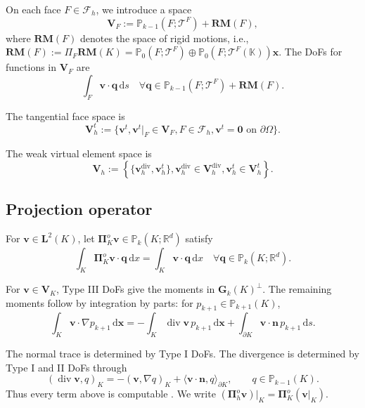 \documentclass[review,hidelinks,onefignum,onetabnum]{siamart251216}
\newcommand{\AI}[1]{{\color{blue}#1}}
\begin{document}
On each face \(F \in \mathcal{F}_h\), we introduce a space 
$$
\boldsymbol{V}_F := \mathbb{P}_{k-1}(F;\mathscr T^F) + \mathbf{RM}(F),
$$
 where \(\mathbf{RM}(F)\) denotes the space of rigid motions, i.e., \(\mathbf{RM}(F) :=\Pi_F \mathbf{RM}(K)= \mathbb{P}_0(F; \mathscr T^F) \oplus \mathbb{P}_0(F; \mathscr T^F(\mathbb K)) \boldsymbol{x}\). The DoFs for functions in \(\boldsymbol{V}_F\) are
\[
\int_F \boldsymbol{v} \cdot \boldsymbol{q} \, \mathrm{d}s \quad \forall \boldsymbol{q} \in \mathbb{P}_{k-1}(F;\mathscr T^F) + \mathbf{RM}(F).
\]

The tangential face space is
\[
\boldsymbol{V}_h^t := \{ \boldsymbol{v}^t, \boldsymbol{v}^t|_F \in \boldsymbol{V}_F, F \in \mathcal{F}_h, \boldsymbol{v}^t = \boldsymbol{0} \text{ on } \partial \Omega \}.
\]

The weak virtual element space is
\[
\boldsymbol{V}_h := \left\{ \{ \boldsymbol{v}_h^{\operatorname{div}}, \boldsymbol{v}_h^t \}, \boldsymbol{v}_h^{\operatorname{div}} \in \boldsymbol{V}_h^{\operatorname{div}}, \boldsymbol{v}_h^t \in \boldsymbol{V}_h^t \right\}.
\]

\subsection{Projection operator}

\AI{For $\boldsymbol v\in\boldsymbol L^2(K)$,} let \(\boldsymbol{\Pi}_K^o \boldsymbol{v} \in \mathbb{P}_k(K;\mathbb{R}^d)\) satisfy
\[
\int_K \boldsymbol{\Pi}_K^o \boldsymbol{v} \cdot \boldsymbol{q}\,\mathrm dx = \int_K \boldsymbol{v} \cdot \boldsymbol{q}\,\mathrm dx \quad \forall \boldsymbol{q} \in \mathbb{P}_k(K;\mathbb{R}^d).
\]

For $\boldsymbol v\in\boldsymbol V_K$, Type III DoFs give the moments in $\mathbf G_k(K)^\perp$. The remaining moments follow by integration by parts: for $p_{k+1}\in\mathbb P_{k+1}(K)$,
\[
\int_K \boldsymbol{v} \cdot \nabla p_{k+1} \, \mathrm{d}\boldsymbol{x} = - \int_K \operatorname{div} \boldsymbol{v} \, p_{k+1} \, \mathrm{d}\boldsymbol{x} + \int_{\partial K} \boldsymbol{v} \cdot \boldsymbol{n} \, p_{k+1} \, \mathrm{d}s.
\]

\AI{The normal trace is determined by Type I DoFs. The divergence is determined
by Type I and II DoFs through
\[
(\operatorname{div}\boldsymbol v,q)_K
=-(\boldsymbol v,\nabla q)_K+\langle\boldsymbol v\cdot\boldsymbol n,q\rangle_{\partial K},
\qquad q\in\mathbb P_{k-1}(K).
\]
Thus every term above is computable \cite{BBMR2016}. We write
$(\boldsymbol\Pi_h^o\boldsymbol v)|_K=\boldsymbol\Pi_K^o(\boldsymbol v|_K)$.}
\end{document}
